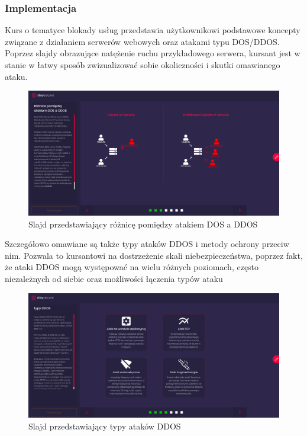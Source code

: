 \documentclass[12pt,twoside]{article}
\begin{document}
\subsubsection{Implementacja}

Kurs o tematyce blokady usług przedstawia użytkownikowi podstawowe koncepty związane z działaniem serwerów webowych oraz atakami typu DOS/DDOS. Poprzez slajdy obrazujące natężenie ruchu przykładowego serwera, kursant jest w stanie w łatwy sposób zwizualizować sobie okoliczności i skutki omawianego ataku.

\begin{figure}[H]
	\centering
	\includegraphics[width=1\linewidth]{figures/dos-slide-screenshot1}
	\caption{Slajd przedstawiający różnicę pomiędzy atakiem DOS a DDOS}
\end{figure}

Szczegółowo omawiane są także typy ataków DDOS i metody ochrony przeciw nim.
Pozwala to kursantowi na dostrzeżenie skali niebezpieczeństwa, poprzez fakt, że ataki DDOS mogą występować na wielu różnych poziomach, często niezależnych od siebie oraz możliwości łączenia typów ataku

\begin{figure}[H]
	\centering
	\includegraphics[width=1\linewidth]{figures/dos-slide-screenshot2}
	\caption{Slajd przedstawiający typy ataków DDOS}
\end{figure}
\end{document}
